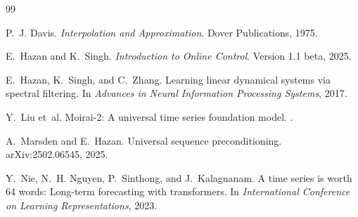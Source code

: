 \documentclass[11pt]{article}
\theoremstyle{plain}
\theoremstyle{definition}
\theoremstyle{remark}
\begin{document}
\begin{thebibliography}{99}

P.~J. Davis.
\newblock \emph{Interpolation and Approximation}.
\newblock Dover Publications, 1975.

E.~Hazan and K.~Singh.
\newblock \emph{Introduction to Online Control}.
\newblock Version 1.1 beta, 2025.

E.~Hazan, K.~Singh, and C.~Zhang.
\newblock Learning linear dynamical systems via spectral filtering.
\newblock In \emph{Advances in Neural Information Processing Systems}, 2017.

Y.~Liu et~al.
\newblock Moirai-2: A universal time series foundation model.
.

A.~Marsden and E.~Hazan.
\newblock Universal sequence preconditioning.
\newblock arXiv:2502.06545, 2025.

Y.~Nie, N.~H. Nguyen, P.~Sinthong, and J.~Kalagnanam.
\newblock A time series is worth 64 words: Long-term forecasting with transformers.
\newblock In \emph{International Conference on Learning Representations}, 2023.

\end{thebibliography}
\end{document}
